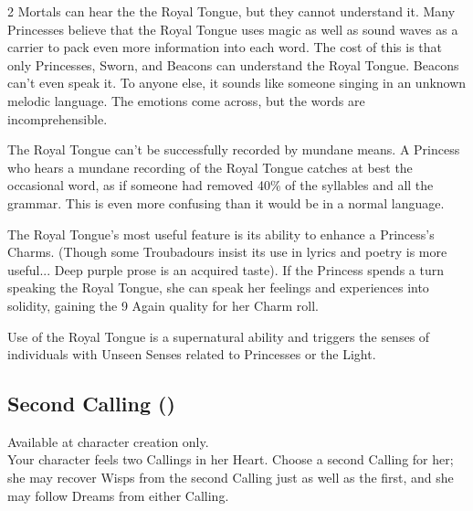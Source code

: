 \begin{multicols}{2}
Mortals can hear the the Royal Tongue, but they cannot understand it. Many Princesses believe that the Royal Tongue uses magic as well as sound waves as a carrier to pack even more information into each word. The cost of this is that only Princesses, Sworn, and Beacons can understand the Royal Tongue. Beacons can't even speak it. To anyone else, it sounds like someone singing in an unknown melodic language. The emotions come across, but the words are incomprehensible. 

The Royal Tongue can't be successfully recorded by mundane means. A Princess who hears a mundane recording of the Royal Tongue catches at best the occasional word, as if someone had removed 40\% of the syllables and all the grammar. This is even more confusing than it would be in a normal language.

The Royal Tongue's most useful feature is its ability to enhance a Princess's Charms. (Though some Troubadours insist its use in lyrics and poetry is more useful... Deep purple prose is an acquired taste). If the Princess spends a turn speaking the Royal Tongue, she can speak her feelings and experiences into solidity, gaining the 9 Again quality for her Charm roll. 

Use of the Royal Tongue is a supernatural ability and triggers the senses of individuals with Unseen Senses related to Princesses or the Light.

\subsection*{Second Calling (\textbullet\textbullet)}

Available at character creation only.\\

\noindent Your character feels two Callings in her Heart. Choose a second Calling for her; she may recover Wisps from the second Calling just as well as the first, and she may follow Dreams from either Calling. 


\end{multicols}
